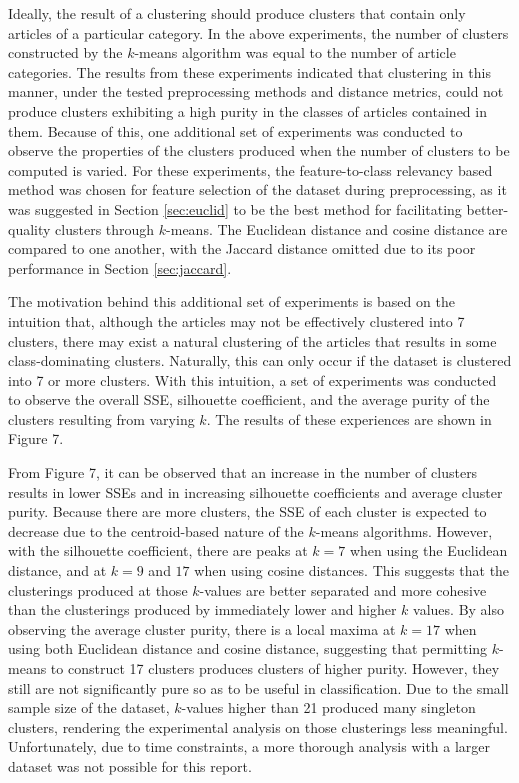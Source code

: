\documentclass[11pt]{article}
\begin{document}
Ideally, the result of a clustering should produce clusters that contain only articles of a particular category.
In the above experiments, the number of clusters constructed by the $k$-means algorithm was equal to the number of article categories.
The results from these experiments indicated that clustering in this manner, under the tested preprocessing methods and distance metrics, could not produce clusters exhibiting a high purity in the classes of articles contained in them.
Because of this, one additional set of experiments was conducted to observe the properties of the clusters produced when the number of clusters to be computed is varied.
For these experiments, the feature-to-class relevancy based method was chosen for feature selection of the dataset during preprocessing, as it was suggested in Section \ref{sec:euclid} to be the best method for facilitating better-quality clusters through $k$-means.
The Euclidean distance and cosine distance are compared to one another, with the Jaccard distance omitted due to its poor performance in Section \ref{sec:jaccard}.

The motivation behind this additional set of experiments is based on the intuition that, although the articles may not be effectively clustered into 7 clusters, there may exist a natural clustering of the articles that results in some class-dominating clusters.
Naturally, this can only occur if the dataset is clustered into 7 or more clusters.
With this intuition, a set of experiments was conducted to observe the overall SSE, silhouette coefficient, and the average purity of the clusters resulting from varying $k$.
The results of these experiences are shown in Figure 7.

From Figure 7, it can be observed that an increase in the number of clusters results in lower SSEs and in increasing silhouette coefficients and average cluster purity.
Because there are more clusters, the SSE of each cluster is expected to decrease due to the centroid-based nature of the $k$-means algorithms.
However, with the silhouette coefficient, there are peaks at $k = 7$ when using the Euclidean distance, and at $k = 9$ and $17$ when using cosine distances.
This suggests that the clusterings produced at those $k$-values are better separated and more cohesive than the clusterings produced by immediately lower and higher $k$ values.
By also observing the average cluster purity, there is a local maxima at $k = 17$ when using both Euclidean distance and cosine distance, suggesting that permitting $k$-means to construct 17 clusters produces clusters of higher purity.
However, they still are not significantly pure so as to be useful in classification.
Due to the small sample size of the dataset, $k$-values higher than 21 produced many singleton clusters, rendering the experimental analysis on those clusterings less meaningful.
Unfortunately, due to time constraints, a more thorough analysis with a larger dataset was not possible for this report.
\end{document}
